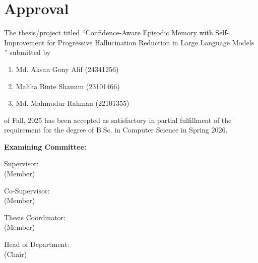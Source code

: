 \section*{Approval}

The thesis/project titled “Confidence-Aware Episodic Memory with Self-Improvement
for Progressive Hallucination Reduction in Large Language
Models ” submitted by 
\begin{enumerate}
  \item Md. Aksan Gony Alif (24341256)
  \item Maliha Binte Shamim (23101466)
  \item Md. Mahmudur Rahman (22101355) 
\end{enumerate}

of Fall, 2025 has been accepted as satisfactory in partial fulfillment of the requirement for the degree of B.Sc. in Computer Science in Spring 2026. 

\vspace{0.5cm}
\textbf{Examining Committee:}

\vspace{1cm}

Supervisor:\\
(Member)
\begin{center}
    \hspace{7cm}  \hspace{1cm} 
\end{center}

Co-Supervisor:\\
(Member)
\begin{center}
    \hspace{7cm}  \hspace{1cm} 
\end{center}


Thesis Coordinator:\\
(Member)
\begin{center}
    \hspace{7cm}  \hspace{1cm} 
\end{center}

Head of Department:\\
(Chair)
\begin{center}
    \hspace{7cm}  \hspace{1cm} 
\end{center}

\pagebreak